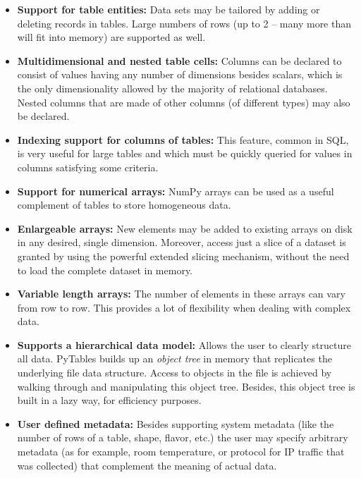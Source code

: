 \begin{itemize}
\item \textbf{Support for table entities:} Data sets may be tailored by
  adding or deleting records in tables. Large
  numbers of rows (up to 2 -- many more than will fit into memory)
  are supported as well.

\item \textbf{Multidimensional and nested table
  cells:} Columns can be declared to consist of values
  having any number of dimensions besides scalars, which is the only
  dimensionality allowed by the majority of relational databases.
  Nested columns that are made of other columns (of
  different types) may also be declared.

\item \textbf{Indexing support for columns of tables:}
  This feature, common in SQL, is very useful for large tables and which 
  must be quickly queried for values in columns satisfying some criteria.

\item \textbf{Support for numerical arrays:}
  NumPy \cite{Oliphant2007} arrays can be used as a useful 
  complement of tables to store homogeneous data.

\item \textbf{Enlargeable arrays:} New
  elements may be added to existing arrays on disk in any desired, single dimension.
  Moreover, access just a slice of a 
  dataset is granted by using the powerful extended slicing mechanism, without
  the need to load the complete dataset in memory.

\item \textbf{Variable length arrays:} The number of
  elements in these arrays can vary from row to row. This provides a
  lot of flexibility when dealing with complex data.

\item \textbf{Supports a hierarchical data model:}
  Allows the user to clearly structure all data. PyTables builds up
  an \emph{object tree} in memory that replicates the
  underlying file data structure. Access to objects in the file is
  achieved by walking through and manipulating this object tree.
  Besides, this object tree is built in a lazy way, for efficiency
  purposes.

\item \textbf{User defined metadata:} Besides
  supporting system metadata (like the number of rows of a table,
  shape, flavor, etc.) the user may specify arbitrary metadata (as
  for example, room temperature, or protocol for IP traffic that was
  collected) that complement the meaning of actual data.


\end{itemize}
